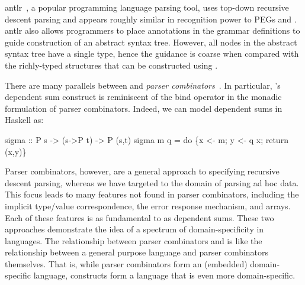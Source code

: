 \documentclass[11pt]{article}
\begin{document}
{\sc antlr}~\cite{antlr}, a popular programming language parsing tool, 
uses top-down recursive descent
parsing and appears roughly similar in recognition power to PEGs and \ddc.
{\sc antlr} also allows programmers to place annotations
in the grammar definitions to guide construction of an abstract syntax
tree. However, all nodes in the abstract syntax tree have a 
single type, hence the guidance is coarse when compared with
the richly-typed structures that can be constructed using
\ddc.




There are many parallels between \ddc{} and {\it parser
combinators}~\cite{burge:parser-combinators,hutton+:parser-combinators}. 
In particular, \ddc{}'s dependent sum construct is 
reminiscent of the bind operator in the monadic formulation of parser
combinators.  Indeed, we can model dependent sums in Haskell as:
\begin{code}
\mbox{}
sigma :: P s -> (s->P t) -> P (s,t)
sigma m q = do \{x <- m; y <- q x; return (x,y)\}
\mbox{}
\end{code}%
\noindent
Parser combinators, however, are a general approach to specifying
recursive descent parsing, whereas we have targeted \ddc{}
to the domain of parsing ad hoc data. This focus leads to 
many features not found in parser combinators, including the implicit
type/value correspondence, the error response mechanism, and 
arrays. Each of these features is as fundamental to \ddc{} as 
dependent sums. These two approaches
demonstrate the idea of a spectrum of domain-specificity in
languages. The relationship between parser combinators and \ddc{} is
like the relationship between a general purpose language and parser
combinators themselves. That is, while parser combinators form an
(embedded) domain-specific language, \ddc{} constructs form a language 
that is even more domain-specific. 
\end{document}

